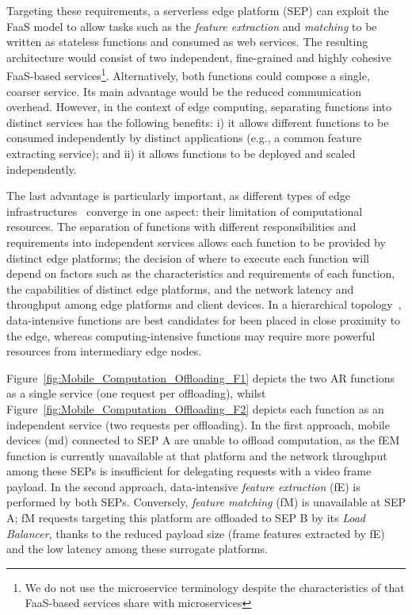 \documentclass[letterpaper, 10 pt, conference]{ieeeconf}  %
\begin{document}
Targeting these requirements, a serverless edge platform (SEP) can exploit the FaaS model to allow tasks such as the \textit{feature extraction} and \textit{matching} to be written as stateless functions and consumed as web services. The resulting architecture would consist of two independent, fine-grained and highly cohesive FaaS-based services\footnote{We do not use the microservice terminology despite the characteristics of that FaaS-based services share with microservices}. Alternatively, both functions could compose a single, coarser service. Its main advantage would be the reduced communication overhead. However, in the context of edge computing, separating functions into distinct services has the following benefits: i) it allows different functions to be consumed independently by distinct applications (e.g., a common feature extracting service); and ii) it allows functions to be deployed and scaled independently.%

The last advantage is particularly important, as different types of edge infrastructures~\cite{Satyanarayanan:2009,Taleb:2013,Liu:2014,K.Wang:2015} converge in one aspect: their limitation of computational resources. The separation of functions with different responsibilities and requirements into independent services allows each function to be provided by distinct edge platforms; the decision of where to execute each function will depend on factors such as the characteristics and requirements of each function, the capabilities of distinct edge platforms, and the network latency and throughput among edge platforms and client devices. In a hierarchical topology~\cite{Liu:2014}, data-intensive functions are best candidates for been placed in close proximity to the edge, whereas computing-intensive functions may require more powerful resources from intermediary edge nodes. 

Figure~\ref{fig:Mobile_Computation_Offloading_F1} depicts the two AR functions as a single service (one request per offloading), whilst Figure~\ref{fig:Mobile_Computation_Offloading_F2} depicts each function as an independent service (two requests per offloading). 
In the first approach, mobile devices (md) connected to SEP A are unable to offload computation, as the fEM function is currently unavailable at that platform and the network throughput among these SEPs is insufficient for delegating requests with a video frame payload.
In the second approach, data-intensive \textit{feature extraction} (fE) is performed by both SEPs. Conversely, \textit{feature matching} (fM) is unavailable at SEP A; fM requests targeting this platform are offloaded to SEP B by its \textit{Load Balancer},
thanks to the reduced payload size (frame features extracted by fE) and the low latency among these surrogate platforms. 
\end{document}
